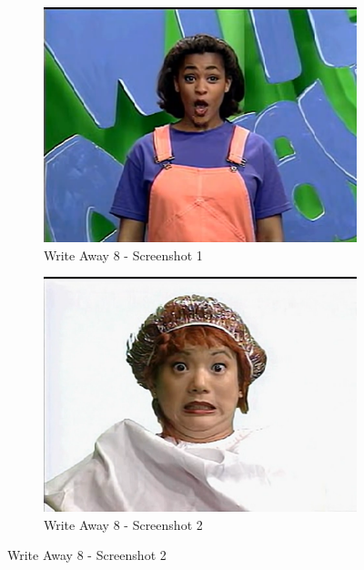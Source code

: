 \begin{figure}[H]
    \centering
    \begin{subfigure}{0.45\textwidth}
        \centering
        \includegraphics[width=\linewidth]{Games/WriteAway/Images/WriteAway8Screenshot1.png}
        \caption{Write Away 8 - Screenshot 1}
    \end{subfigure}
    \begin{subfigure}{0.45\textwidth}
        \centering
        \includegraphics[width=\linewidth]{Games/WriteAway/Images/WriteAway8Screenshot2.png}
        \caption{Write Away 8 - Screenshot 2}
    \end{subfigure}


\end{figure}
